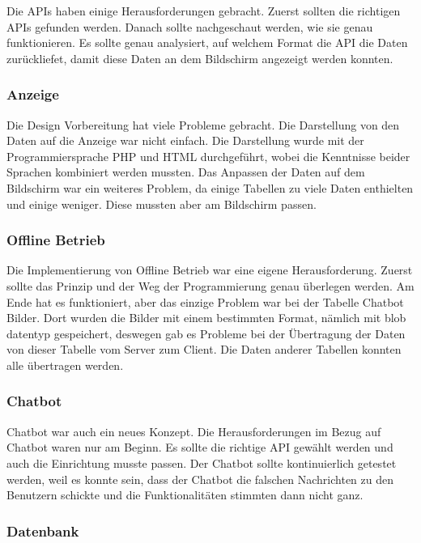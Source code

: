 Die APIs haben einige Herausforderungen gebracht. Zuerst sollten die richtigen APIs gefunden werden. Danach sollte nachgeschaut werden, wie sie genau funktionieren. Es sollte genau analysiert, auf welchem Format die API die Daten zurückliefet, damit diese Daten an dem Bildschirm angezeigt werden konnten. 

\subsubsection{Anzeige}
Die Design Vorbereitung hat viele Probleme gebracht. Die Darstellung von den Daten auf die Anzeige war nicht einfach. Die Darstellung wurde mit der Programmiersprache PHP und HTML durchgeführt, wobei die Kenntnisse beider Sprachen kombiniert werden mussten. Das Anpassen der Daten auf dem Bildschirm war ein weiteres Problem, da einige Tabellen zu viele Daten enthielten und einige weniger. Diese mussten aber am Bildschirm passen.

\subsubsection{Offline Betrieb}
Die Implementierung von Offline Betrieb war eine eigene Herausforderung. Zuerst sollte das Prinzip und der Weg der Programmierung genau \"uberlegen werden. Am Ende hat es funktioniert, aber das einzige Problem war bei der Tabelle Chatbot Bilder. Dort wurden die Bilder mit einem bestimmten Format, n\"amlich mit blob datentyp gespeichert, deswegen gab es Probleme bei der \"Ubertragung der Daten von dieser Tabelle vom Server zum Client. Die Daten anderer Tabellen konnten alle \"ubertragen werden. 

\subsubsection{Chatbot}

Chatbot war auch ein neues Konzept. Die Herausforderungen im Bezug auf Chatbot waren nur am Beginn. Es sollte die richtige API gewählt werden und auch die Einrichtung musste passen. Der Chatbot sollte kontinuierlich getestet werden, weil es konnte sein, dass der Chatbot die falschen Nachrichten zu den Benutzern schickte und die Funktionalit\"aten stimmten dann nicht ganz.

\subsubsection{Datenbank}

